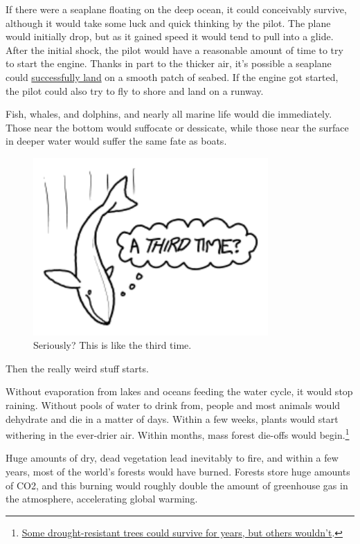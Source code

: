 {{If there were a seaplane floating on the deep ocean, it could conceivably survive, although it would take some luck and quick thinking by the pilot. The plane would initially drop, but as it gained speed it would tend to pull into a glide. After the initial shock, the pilot would have a reasonable amount of time to try to start the engine. Thanks in part to the thicker air, it's possible a seaplane could \href{https://www.youtube.com/watch?v=YZx6wa6zHAc}{successfully land} on a smooth patch of seabed. If the engine got started, the pilot could also try to fly to shore and land on a runway.}

{Fish, whales, and dolphins, and nearly all marine life would die immediately. Those near the bottom would suffocate or dessicate, while those near the surface in deeper water would suffer the same fate as boats.}

\begin{figure}[!htbp]
\centering
\includegraphics[scale=0.5, max width=0.8\textwidth]{imgs/a/103/whale.png}
\caption{Seriously? This is like the third time.}
\end{figure}

{Then the really weird stuff starts.}

{Without evaporation from lakes and oceans feeding the water cycle, it would stop raining. Without pools of water to drink from, people and most animals would dehydrate and die in a matter of days. Within a few weeks, plants would start withering in the ever-drier air. Within months, mass forest die-offs would begin.{\footnote{ \href{http://treephys.oxfordjournals.org/content/33/3/252.full}{Some drought-resistant trees could survive for years, but others wouldn't}.} } }

{Huge amounts of dry, dead vegetation lead inevitably to fire, and within a few years, most of the world's forests would have burned. Forests store huge amounts of CO2, and this burning would roughly double the amount of greenhouse gas in the atmosphere, accelerating global warming.}

}
